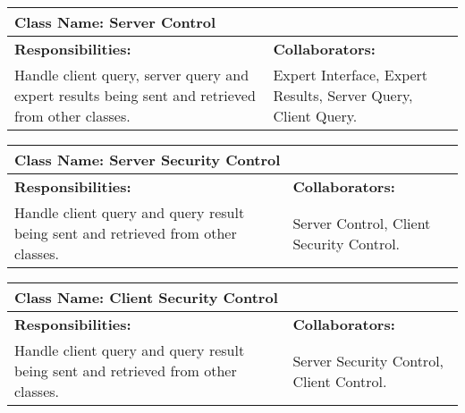 \documentclass[]{article}
\begin{document}
\begin{enumerate}[a)]
\begin{table}[ht]
\begin{tabular}{|p{5cm}|p{5cm}|}
		\hline				
		\end{tabular}
	\end{table}

\begin{table}[ht]
		\centering
		\begin{tabular}{|p{5cm}|p{5cm}|}
		\hline 
		 \multicolumn{2}{|l|}{\textbf{Class Name: Server Control}} \\
		\hline
		\textbf{Responsibilities: } & \textbf{Collaborators:} \\
		\hline
		Handle client query, server query and expert results being sent and retrieved from other classes.	
		\vspace{1in} & Expert Interface, Expert Results, Server Query, Client Query.\\
		
		\hline				
		\end{tabular}
	\end{table}

\begin{table}[ht]
		\centering
		\begin{tabular}{|p{5cm}|p{5cm}|}
		\hline 
		 \multicolumn{2}{|l|}{\textbf{Class Name: Server Security Control}} \\
		\hline
		\textbf{Responsibilities: } & \textbf{Collaborators:} \\
		\hline
		Handle client query and query result being sent and retrieved from other classes.	
		\vspace{1in} & Server Control, Client Security Control.\\
		
		\hline				
		\end{tabular}
	\end{table}

\begin{table}[ht]
		\centering
		\begin{tabular}{|p{5cm}|p{5cm}|}
		\hline 
		 \multicolumn{2}{|l|}{\textbf{Class Name: Client Security Control}} \\
		\hline
		\textbf{Responsibilities: } & \textbf{Collaborators:} \\
		\hline
		Handle client query and query result being sent and retrieved from other classes.	
		\vspace{1in} & Server Security Control, Client Control.\\
		
		\hline				
		\end{tabular}
	\end{table}


\end{enumerate}
\end{document}
